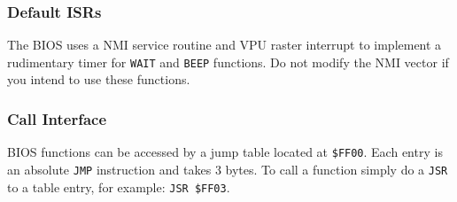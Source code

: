 \documentclass[a4paper,10pt,oneside]{article}
\begin{document}
\subsubsection*{Default ISRs}
The BIOS uses a NMI service routine and VPU raster interrupt to implement a rudimentary timer for \texttt{WAIT} and \texttt{BEEP} functions. Do not modify the NMI vector if you intend to use these functions.

\subsubsection*{Call Interface}
BIOS functions can be accessed by a jump table located at \texttt{\$FF00}. Each entry is an absolute \texttt{JMP} instruction and takes 3 bytes. To call a function simply do a \texttt{JSR} to a table entry, for example: \texttt{JSR \$FF03}.

\newpage
\end{document}
